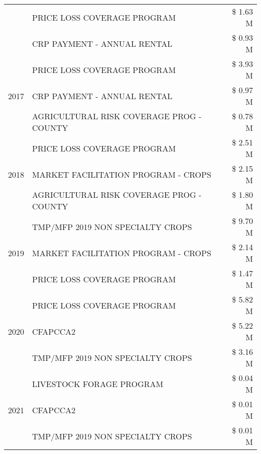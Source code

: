 \begin{tabular}{llr}
 & PRICE LOSS COVERAGE PROGRAM & \$ 1.63 M \\
 & CRP PAYMENT - ANNUAL RENTAL & \$ 0.93 M \\
\cline{1-3}
\multirow[t]{3}{*}{2017} & PRICE LOSS COVERAGE PROGRAM & \$ 3.93 M \\
 & CRP PAYMENT - ANNUAL RENTAL & \$ 0.97 M \\
 & AGRICULTURAL RISK COVERAGE PROG - COUNTY & \$ 0.78 M \\
\cline{1-3}
\multirow[t]{3}{*}{2018} & PRICE LOSS COVERAGE PROGRAM & \$ 2.51 M \\
 & MARKET FACILITATION PROGRAM - CROPS & \$ 2.15 M \\
 & AGRICULTURAL RISK COVERAGE PROG - COUNTY & \$ 1.80 M \\
\cline{1-3}
\multirow[t]{3}{*}{2019} & TMP/MFP 2019 NON SPECIALTY CROPS & \$ 9.70 M \\
 & MARKET FACILITATION PROGRAM - CROPS & \$ 2.14 M \\
 & PRICE LOSS COVERAGE PROGRAM & \$ 1.47 M \\
\cline{1-3}
\multirow[t]{3}{*}{2020} & PRICE LOSS COVERAGE PROGRAM & \$ 5.82 M \\
 & CFAPCCA2 & \$ 5.22 M \\
 & TMP/MFP 2019 NON SPECIALTY CROPS & \$ 3.16 M \\
\cline{1-3}
\multirow[t]{3}{*}{2021} & LIVESTOCK FORAGE PROGRAM & \$ 0.04 M \\
 & CFAPCCA2 & \$ 0.01 M \\
 & TMP/MFP 2019 NON SPECIALTY CROPS & \$ 0.01 M \\
\cline{1-3}
\bottomrule
\end{tabular}
